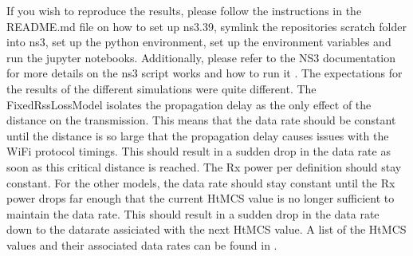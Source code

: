 If you wish to reproduce the results, please follow the instructions in the README.md file on how to 
set up ns3.39, symlink the repositories scratch folder into ns3, set up the python environment, set up the 
environment variables and run the jupyter notebooks.
Additionally, please refer to the NS3 documentation for more details on the ns3 script
works and how to run it \cite{ns3doc}.
The expectations for the results of the different simulations were quite different.
The FixedRssLossModel isolates the propagation delay as the only effect of the distance on the transmission. This means 
that the data rate should be constant until the distance is so large that the propagation delay causes issues with the 
WiFi protocol timings. This should result in a sudden drop in the data rate as soon as this 
critical distance is reached. The Rx power per definition should stay constant.
For the other models, the data rate should stay constant until the Rx power drops far enough that the current HtMCS value is 
no longer sufficient to maintain the data rate. This should result in a sudden drop in the data rate down to the datarate assiciated with the 
next HtMCS value. A list of the HtMCS values and their associated data rates can be found in \cite[this table by the wireless lan professionals conference]{MCS}.
